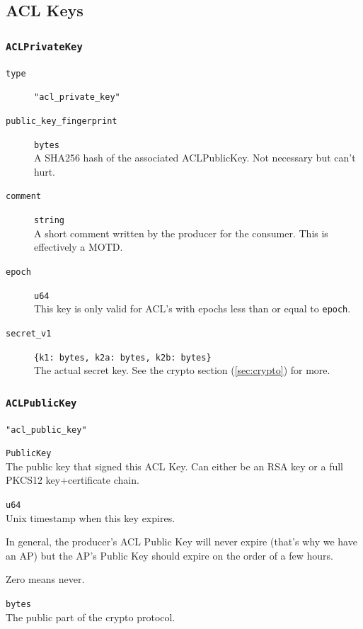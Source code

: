 \documentclass[pdftex,12pt,a4papaer,twoside,notitlepage]{report}
\begin{document}
\subsection{ACL Keys}

\subsubsection{\texttt{ACLPrivateKey}}

\begin{leftbar}
\begin{description}
\item[\texttt{type}] \verb="acl_private_key"=
\item[\texttt{public\_key\_fingerprint}] \texttt{bytes} \\
  A SHA256 hash of the associated ACLPublicKey. Not necessary but can't hurt.

\item[\texttt{comment}] \texttt{string} \\
  A short comment written by the producer for the consumer. This is effectively a MOTD.
\item[\texttt{epoch}] \texttt{u64} \\
  This key is only valid for ACL's with epochs less than or equal to \texttt{epoch}.
\item[\texttt{secret\_v1}] \verb={k1: bytes, k2a: bytes, k2b: bytes}= \\
  The actual secret key. See the crypto section (\ref{sec:crypto}) for more.
\end{description}
\end{leftbar}

\subsubsection{\texttt{ACLPublicKey}}

\begin{leftbar}
\begin{description}[labelindent=2em,leftmargin=3em]
\item[\texttt{type}] \verb="acl_public_key"=
\item[\texttt{signing\_key}] \texttt{PublicKey} \\
  The public key that signed this ACL Key. Can either be an RSA key or a
  full PKCS12 key+certificate chain.

\item[\texttt{expires}] \texttt{u64} \\
  Unix timestamp when this key expires.

  In general, the producer's ACL Public Key will never expire (that's why we
  have an AP) but the AP's Public Key should expire on the order of a few
  hours.
  
  Zero means never.

\item[\texttt{public\_v1}] \texttt{bytes} \\
  The public part of the crypto protocol.
\end{description}
\end{leftbar}
\end{document}

